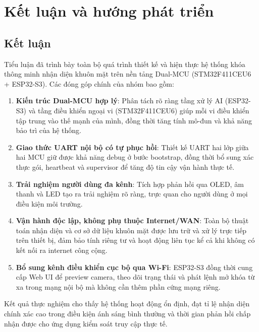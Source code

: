 \chapter{Kết luận và hướng phát triển}
\label{chap:conclusion}

\section{Kết luận}
\label{sec:conclusion}

Tiểu luận đã trình bày toàn bộ quá trình thiết kế và hiện thực hệ thống khóa thông minh nhận diện khuôn mặt trên nền tảng Dual-MCU (STM32F411CEU6 + ESP32-S3). Các đóng góp chính của nhóm bao gồm:

\begin{enumerate}[label=\arabic*.]
  \item \textbf{Kiến trúc Dual-MCU hợp lý}: Phân tách rõ ràng tầng xử lý AI (ESP32-S3) và tầng điều khiển ngoại vi (STM32F411CEU6) giúp mỗi vi điều khiển tập trung vào thế mạnh của mình, đồng thời tăng tính mô-đun và khả năng bảo trì của hệ thống.
  \item \textbf{Giao thức UART nội bộ có tự phục hồi}: Thiết kế UART hai lớp giữa hai MCU giữ được khả năng debug ở bước bootstrap, đồng thời bổ sung xác thực gói, heartbeat và supervisor để tăng độ tin cậy vận hành thực tế.
  \item \textbf{Trải nghiệm người dùng đa kênh}: Tích hợp phản hồi qua OLED, âm thanh và LED tạo ra trải nghiệm rõ ràng, trực quan cho người dùng ở mọi điều kiện môi trường.
  \item \textbf{Vận hành độc lập, không phụ thuộc Internet/WAN}: Toàn bộ thuật toán nhận diện và cơ sở dữ liệu khuôn mặt được lưu trữ và xử lý trực tiếp trên thiết bị, đảm bảo tính riêng tư và hoạt động liên tục kể cả khi không có kết nối ra internet công cộng.
  \item \textbf{Bổ sung kênh điều khiển cục bộ qua Wi-Fi}: ESP32-S3 đồng thời cung cấp Web UI để preview camera, theo dõi trạng thái và phát lệnh mở khóa từ xa trong mạng nội bộ mà không cần thêm phần cứng mạng riêng.
\end{enumerate}

Kết quả thực nghiệm cho thấy hệ thống hoạt động ổn định, đạt tỉ lệ nhận diện chính xác cao trong điều kiện ánh sáng bình thường và thời gian phản hồi chấp nhận được cho ứng dụng kiểm soát truy cập thực tế.

